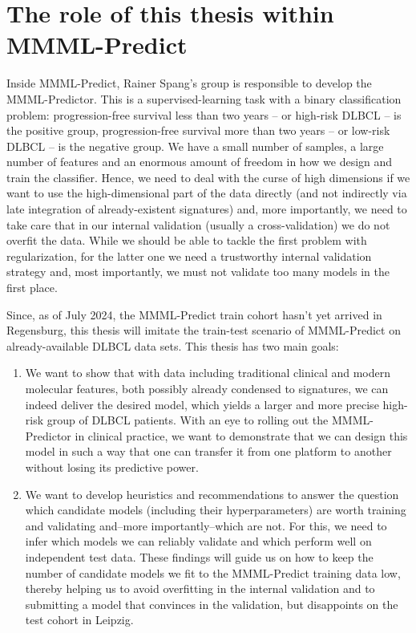 \section{The role of this thesis within MMML-Predict}

Inside MMML-Predict, Rainer Spang's group is responsible to develop the MMML-Predictor. This is 
a supervised-learning task with a binary classification problem: progression-free survival less than 
two years -- or high-risk DLBCL -- is the positive group, progression-free survival more than two 
years -- or low-risk DLBCL -- is the negative group. We have a small number of samples, a large 
number of features and an enormous amount of freedom in how we design and train the classifier. 
Hence, we need to deal with the curse of high dimensions if we want to use the high-dimensional part 
of the data directly (and not indirectly via late integration of already-existent signatures) and, 
more importantly, we need to take care that in our internal validation (usually a cross-validation)
we do not overfit the data. While we should be able to tackle the first problem with regularization,
for the latter one we need a trustworthy internal validation strategy and, most importantly, we 
must not validate too many models in the first place.

Since, as of July 2024, the MMML-Predict train cohort hasn't yet arrived in Regensburg, this thesis
will imitate the train-test scenario of MMML-Predict on already-available DLBCL data sets. This thesis 
has two main goals:
\begin{enumerate}
    \item We want to show that with data including traditional clinical and modern 
        molecular features, both possibly already condensed to signatures, we can indeed deliver 
        the desired model, which yields a larger and more precise high-risk group of DLBCL patients.
        With an eye to rolling out the MMML-Predictor in clinical practice, we want to demonstrate 
        that we can design this model in such a way that one can transfer it from one platform to
        another without losing its predictive power.
    \item We want to develop heuristics and recommendations to answer the question which candidate 
        models (including their hyperparameters) are worth training and validating and--more 
        importantly--which are not. For this, we need to infer which models we can reliably validate 
        and which perform well on independent test data. These findings will guide us on how to keep 
        the number of candidate models we fit to the MMML-Predict training data low, thereby helping 
        us to avoid overfitting in the internal validation and to submitting a model that convinces 
        in the validation, but disappoints on the test cohort in Leipzig.
\end{enumerate}